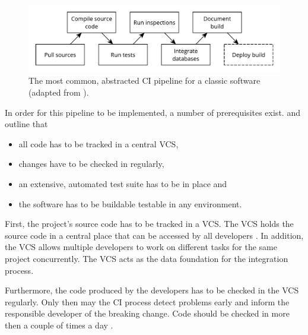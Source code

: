 \begin{figure}[H]
\begin{center}
  \includegraphics[scale=0.7]{images/figures/ci_classic.pdf}
\end{center}
\caption[The most common, abstracted \ac{CI} pipeline for a classic
software.]{The most common, abstracted \ac{CI} pipeline for a classic
software (adapted from \autocite[Fig. 1-4]{MatyasContinuousIntegration2007}).}%
\label{fig:ci_pipeline_classic}
\end{figure}

In order for this pipeline to be implemented, a number of prerequisites exist.
\autocite{MatyasContinuousIntegration2007} and
\autocite{JezHumbleContinuousDelivery2010} outline that

\begin{itemize}
  \item all code has to be tracked in a central \ac{VCS},
  \item changes have to be checked in regularly,
  \item an extensive, automated test suite has to be in place and
  \item the software has to be buildable testable in any environment.
\end{itemize}

First, the project's source code has to be tracked in a \ac{VCS}. The \ac{VCS}
holds the source code in a central place that can be accessed by all developers
\autocite[Ch.  1]{MatyasContinuousIntegration2007}. In addition, the \ac{VCS}
allows multiple developers to work on different tasks for the same project
concurrently. The \ac{VCS} acts as the data foundation for the integration
process.

Furthermore, the code produced by the developers has to be checked in the
\ac{VCS} regularly. Only then may the \ac{CI} process detect problems early and
inform the responsible developer of the breaking change. Code should be checked
in more then a couple of times a day \autocite[p.
59]{JezHumbleContinuousDelivery2010}. 

